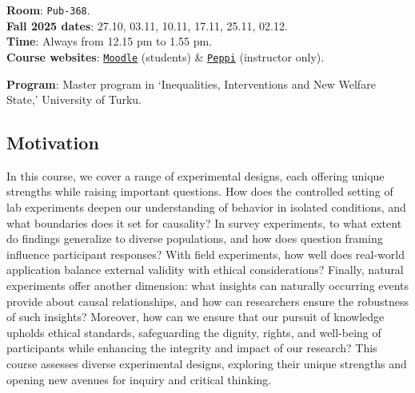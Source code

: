 \documentclass[letterpaper]{article}
\begin{document}
{\bf Room}: \texttt{Pub-368}.\\
{\bf Fall 2025 dates}: 27.10, 03.11, 10.11, 17.11, 25.11, 02.12.\\
{\bf Time}: Always from 12.15 pm to 1.55 pm.\\

{\bf Course websites}: \href{https://moodle.utu.fi/course/view.php?id=33451}{\texttt{Moodle}} (students) \& \href{https://planner.peppi.utu.fi/group/opettajan-tyopoyta/toteutusten-hallinta?p_p_id=RealizationPortlet_WAR_realizationportlet&p_p_lifecycle=0&p_p_state=normal&p_p_mode=view&_RealizationPortlet_WAR_realizationportlet_struts.portlet.action=%2Frealization%2Fbasic&realization.realizationId=45184}{\texttt{Peppi}} (instructor only).




{\bf Program}: Master program in `Inequalities, Interventions and New Welfare State,' University of Turku.%

\subsection*{Motivation}


In this course, we cover a range of experimental designs, each offering unique strengths while raising important questions. How does the controlled setting of lab experiments deepen our understanding of behavior in isolated conditions, and what boundaries does it set for causality? In survey experiments, to what extent do findings generalize to diverse populations, and how does question framing influence participant responses? With field experiments, how well does real-world application balance external validity with ethical considerations? Finally, natural experiments offer another dimension: what insights can naturally occurring events provide about causal relationships, and how can researchers ensure the robustness of such insights? Moreover, how can we ensure that our pursuit of knowledge upholds ethical standards, safeguarding the dignity, rights, and well-being of participants while enhancing the integrity and impact of our research? This course assesses diverse experimental designs, exploring their unique strengths and opening new avenues for inquiry and critical thinking.
\end{document}
